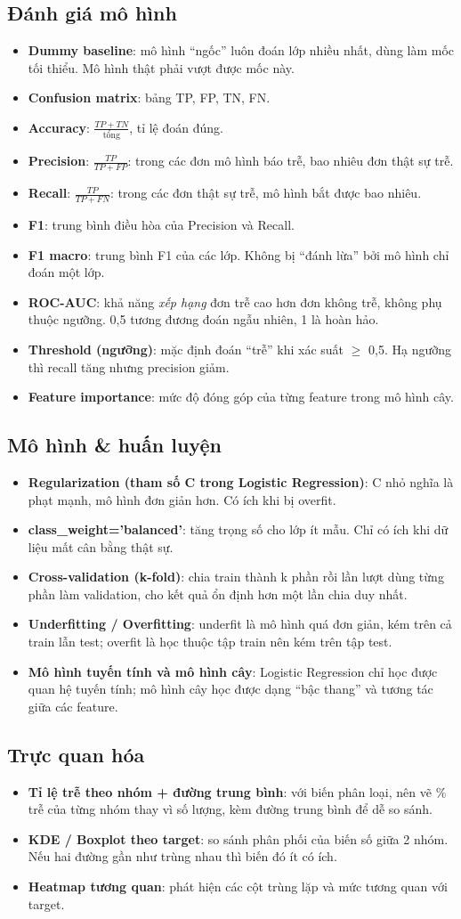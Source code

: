 \documentclass[11pt,a4paper]{article}
\newcommand{\term}[2]{\item \textbf{#1}: #2}
\begin{document}
\subsection{Đánh giá mô hình}
\begin{itemize}
  \term{Dummy baseline}{mô hình ``ngốc'' luôn đoán lớp nhiều nhất, dùng làm mốc tối thiểu. Mô hình thật phải vượt được mốc này.}
  \term{Confusion matrix}{bảng TP, FP, TN, FN.}
  \term{Accuracy}{$\frac{TP+TN}{\text{tổng}}$, tỉ lệ đoán đúng.}
  \term{Precision}{$\frac{TP}{TP+FP}$: trong các đơn mô hình báo trễ, bao nhiêu đơn thật sự trễ.}
  \term{Recall}{$\frac{TP}{TP+FN}$: trong các đơn thật sự trễ, mô hình bắt được bao nhiêu.}
  \term{F1}{trung bình điều hòa của Precision và Recall.}
  \term{F1 macro}{trung bình F1 của các lớp. Không bị ``đánh lừa'' bởi mô hình chỉ đoán một lớp.}
  \term{ROC-AUC}{khả năng \emph{xếp hạng} đơn trễ cao hơn đơn không trễ, không phụ thuộc ngưỡng. 0,5 tương đương đoán ngẫu nhiên, 1 là hoàn hảo.}
  \term{Threshold (ngưỡng)}{mặc định đoán ``trễ'' khi xác suất $\geq$ 0,5. Hạ ngưỡng thì recall tăng nhưng precision giảm.}
  \term{Feature importance}{mức độ đóng góp của từng feature trong mô hình cây.}
\end{itemize}

\subsection{Mô hình \& huấn luyện}
\begin{itemize}
  \term{Regularization (tham số C trong Logistic Regression)}{C nhỏ nghĩa là phạt mạnh, mô hình đơn giản hơn. Có ích khi bị overfit.}
  \term{class\_weight='balanced'}{tăng trọng số cho lớp ít mẫu. Chỉ có ích khi dữ liệu mất cân bằng thật sự.}
  \term{Cross-validation (k-fold)}{chia train thành k phần rồi lần lượt dùng từng phần làm validation, cho kết quả ổn định hơn một lần chia duy nhất.}
  \term{Underfitting / Overfitting}{underfit là mô hình quá đơn giản, kém trên cả train lẫn test; overfit là học thuộc tập train nên kém trên tập test.}
  \term{Mô hình tuyến tính và mô hình cây}{Logistic Regression chỉ học được quan hệ tuyến tính; mô hình cây học được dạng ``bậc thang'' và tương tác giữa các feature.}
\end{itemize}

\subsection{Trực quan hóa}
\begin{itemize}
  \term{Tỉ lệ trễ theo nhóm + đường trung bình}{với biến phân loại, nên vẽ \% trễ của từng nhóm thay vì số lượng, kèm đường trung bình để dễ so sánh.}
  \term{KDE / Boxplot theo target}{so sánh phân phối của biến số giữa 2 nhóm. Nếu hai đường gần như trùng nhau thì biến đó ít có ích.}
  \term{Heatmap tương quan}{phát hiện các cột trùng lặp và mức tương quan với target.}
\end{itemize}
\end{document}
